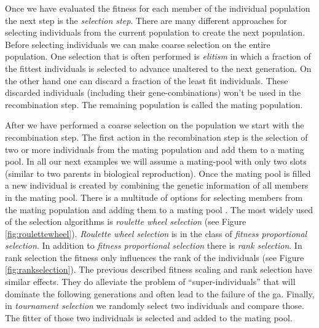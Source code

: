 Once we have evaluated the fitness for each member of the individual population the next step is the \textit{selection step}. There are many different approaches for selecting individuals from the current population to create the next population. Before selecting individuals we can make coarse selection on the entire population. One selection that is often performed is \textit{elitism} in which a fraction of the fittest individuals is selected to advance unaltered to the next generation. On the other hand one can discard a fraction of the least fit individuals. These discarded individuals (including their gene-combinations) won't be used in the recombination step. The remaining population is called the mating population.

After we have performed a coarse selection on the population we start with the recombination step. The first action in the recombination step is the selection of two or more individuals from the mating population and add them to a mating pool. In all our next examples we will assume a mating-pool with only two slots (similar to two parents in biological reproduction). Once the mating pool is filled a new individual is created by combining the genetic information of all members in the mating pool. There is a multitude of options for selecting members from the mating population and adding them to a mating pool \citep[for an overview see]{Goldberg91acomparative}. The most widely used of the selection algorithms is \textit{roulette wheel selection} (see Figure \ref{fig:roulettewheel}). \textit{Roulette wheel selection} is in the class of \textit{fitness proportional selection}. In addition to \textit{fitness proportional selection} there is \textit{rank selection}. In rank selection the fitness only influences the rank of the individuals (see Figure \ref{fig:rankselection}). The previous described fitness scaling and rank selection have similar effects. They do alleviate the problem of ``super-individuals'' that will dominate the following generations and often lead to the failure of the \gls{ga}. Finally, in \textit{tournament selection} we randomly select two individuals and compare those. The fitter of those two individuals is selected and added to the mating pool. 


